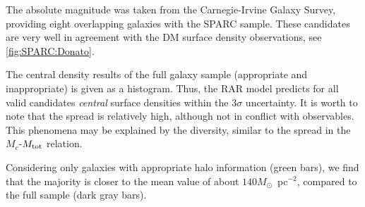 The absolute magnitude was taken from the Carnegie-Irvine Galaxy Survey, providing eight overlapping galaxies with the SPARC sample. These candidates are very well in agreement with the DM surface density observations, see \cref{fig:SPARC:Donato}.

The central density results of the full galaxy sample (appropriate and inappropriate) is given as a histogram. Thus, the RAR model predicts for all valid candidates \textit{central} surface densities within the $3\sigma$ uncertainty. It is worth to note that the spread is relatively high, although not in conflict with observables. This phenomena may be explained by the diversity, similar to the spread in the $M_c$-$M_{\rm tot}$ relation.

Considering only galaxies with appropriate halo information (green bars), we find that the majority is closer to the mean value of about $140 M_\odot$~pc$^{-2}$, compared to the full sample (dark gray bars).

